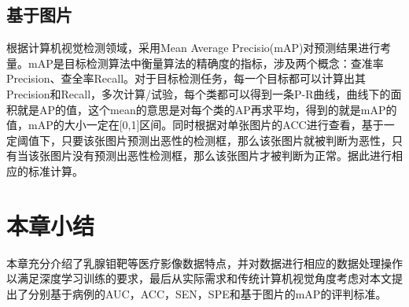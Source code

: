 \subsection{基于图片}

根据计算机视觉检测领域，采用Mean Average Precisio(mAP)对预测结果进行考量。mAP是目标检测算法中衡量算法的精确度的指标，涉及两个概念：查准率Precision、查全率Recall。对于目标检测任务，每一个目标都可以计算出其Precision和Recall，多次计算/试验，每个类都可以得到一条P-R曲线，曲线下的面积就是AP的值，这个mean的意思是对每个类的AP再求平均，得到的就是mAP的值，mAP的大小一定在[0,1]区间。同时根据对单张图片的ACC进行查看，基于一定阈值下，只要该张图片预测出恶性的检测框，那么该张图片就被判断为恶性，只有当该张图片没有预测出恶性检测框，那么该张图片才被判断为正常。据此进行相应的标准计算。

\section{本章小结}
本章充分介绍了乳腺钼靶等医疗影像数据特点，并对数据进行相应的数据处理操作以满足深度学习训练的要求，最后从实际需求和传统计算机视觉角度考虑对本文提出了分别基于病例的AUC，ACC，SEN，SPE和基于图片的mAP的评判标准。



